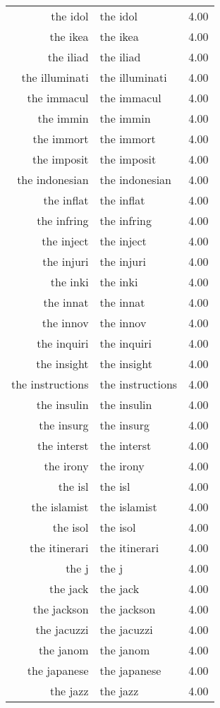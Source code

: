\begin{table}[ht]
\begin{tabular}{rlr}
  the idol & the idol & 4.00 \\ 
  the ikea & the ikea & 4.00 \\ 
  the iliad & the iliad & 4.00 \\ 
  the illuminati & the illuminati & 4.00 \\ 
  the immacul & the immacul & 4.00 \\ 
  the immin & the immin & 4.00 \\ 
  the immort & the immort & 4.00 \\ 
  the imposit & the imposit & 4.00 \\ 
  the indonesian & the indonesian & 4.00 \\ 
  the inflat & the inflat & 4.00 \\ 
  the infring & the infring & 4.00 \\ 
  the inject & the inject & 4.00 \\ 
  the injuri & the injuri & 4.00 \\ 
  the inki & the inki & 4.00 \\ 
  the innat & the innat & 4.00 \\ 
  the innov & the innov & 4.00 \\ 
  the inquiri & the inquiri & 4.00 \\ 
  the insight & the insight & 4.00 \\ 
  the instructions & the instructions & 4.00 \\ 
  the insulin & the insulin & 4.00 \\ 
  the insurg & the insurg & 4.00 \\ 
  the interst & the interst & 4.00 \\ 
  the irony & the irony & 4.00 \\ 
  the isl & the isl & 4.00 \\ 
  the islamist & the islamist & 4.00 \\ 
  the isol & the isol & 4.00 \\ 
  the itinerari & the itinerari & 4.00 \\ 
  the j & the j & 4.00 \\ 
  the jack & the jack & 4.00 \\ 
  the jackson & the jackson & 4.00 \\ 
  the jacuzzi & the jacuzzi & 4.00 \\ 
  the janom & the janom & 4.00 \\ 
  the japanese & the japanese & 4.00 \\ 
  the jazz & the jazz & 4.00 \\ 

\end{tabular}
\end{table}
